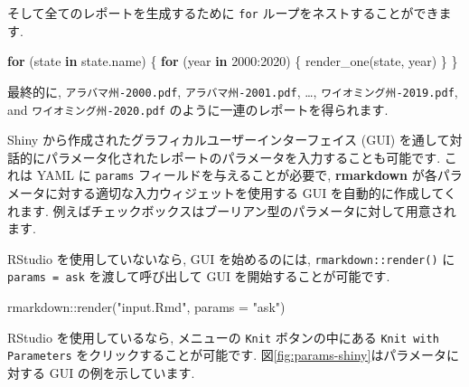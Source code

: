 \documentclass[
  11pt,
]{bxjsreport}
\newenvironment{Shaded}{\begin{snugshade}}{\end{snugshade}}
\newcommand{\AttributeTok}[1]{\textcolor[rgb]{0.77,0.63,0.00}{#1}}
\newcommand{\ControlFlowTok}[1]{\textcolor[rgb]{0.13,0.29,0.53}{\textbf{#1}}}
\newcommand{\DecValTok}[1]{\textcolor[rgb]{0.00,0.00,0.81}{#1}}
\newcommand{\FunctionTok}[1]{\textcolor[rgb]{0.00,0.00,0.00}{#1}}
\newcommand{\NormalTok}[1]{#1}
\newcommand{\SpecialCharTok}[1]{\textcolor[rgb]{0.00,0.00,0.00}{#1}}
\newcommand{\StringTok}[1]{\textcolor[rgb]{0.31,0.60,0.02}{#1}}
\begin{document}
そして全てのレポートを生成するために \texttt{for} ループをネストすることができます.

\begin{Shaded}
\begin{Highlighting}[numbers=left,,]
\ControlFlowTok{for}\NormalTok{ (state }\ControlFlowTok{in}\NormalTok{ state.name) \{}
  \ControlFlowTok{for}\NormalTok{ (year }\ControlFlowTok{in} \DecValTok{2000}\SpecialCharTok{:}\DecValTok{2020}\NormalTok{) \{}
    \FunctionTok{render\_one}\NormalTok{(state, year)}
\NormalTok{  \}}
\NormalTok{\}}
\end{Highlighting}
\end{Shaded}

最終的に, \texttt{アラバマ州-2000.pdf}, \texttt{アラバマ州-2001.pdf}, \ldots, \texttt{ワイオミング州-2019.pdf}, and \texttt{ワイオミング州-2020.pdf} のように一連のレポートを得られます.

Shiny から作成されたグラフィカルユーザーインターフェイス (GUI) を通して対話的にパラメータ化されたレポートのパラメータを入力することも可能です. これは YAML に \texttt{params} フィールドを与えることが必要で, \textbf{rmarkdown} が各パラメータに対する適切な入力ウィジェットを使用する GUI を自動的に作成してくれます. 例えばチェックボックスはブーリアン型のパラメータに対して用意されます.

RStudio を使用していないなら, GUI を始めるのには, \texttt{rmarkdown::render()} に \texttt{params = \textquotesingle{}ask\textquotesingle{}} を渡して呼び出して GUI を開始することが可能です.

\begin{Shaded}
\begin{Highlighting}[numbers=left,,]
\NormalTok{rmarkdown}\SpecialCharTok{::}\FunctionTok{render}\NormalTok{(}\StringTok{"input.Rmd"}\NormalTok{, }\AttributeTok{params =} \StringTok{"ask"}\NormalTok{)}
\end{Highlighting}
\end{Shaded}

RStudio を使用しているなら, メニューの \texttt{Knit} ボタンの中にある \texttt{Knit with Parameters} をクリックすることが可能です. 図\ref{fig:params-shiny}はパラメータに対する GUI の例を示しています.
\end{document}
